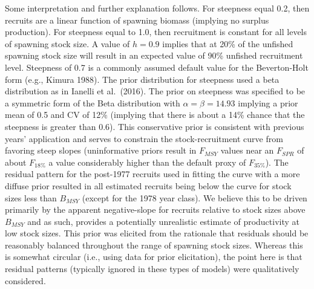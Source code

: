 \documentclass[11pt,
  english,
  a4paper,
]{article}
\begin{document}
\leavevmode\tagmcend\tagstructend\par


Some interpretation and further explanation follows. For steepness equal 0.2, then recruits are a linear function of spawning biomass (implying no surplus production). For steepness equal to 1.0, then recruitment is constant for all levels of spawning stock size. A value of {\(h = 0.9\)\leavevmode\tagmcend\tagstructend} implies that at 20\% of the unfished spawning stock size will result in an expected value of 90\% unfished recruitment level. Steepness of 0.7 is a commonly assumed default value for the Beverton-Holt form (e.g., Kimura 1988). The prior distribution for steepness used a beta distribution as in Ianelli et al.~(2016). The prior on steepness was specified to be a symmetric form of the Beta distribution with {\(\alpha = \beta = 14.93\)\leavevmode\tagmcend\tagstructend} implying a prior mean of 0.5 and CV of 12\% (implying that there is about a 14\% chance that the steepness is greater than 0.6). This conservative prior is consistent with previous years' application and serves to constrain the stock-recruitment curve from favoring steep slopes (uninformative priors result in {\(F_{MSY}\)\leavevmode\tagmcend\tagstructend} values near an {\(F_{SPR}\)\leavevmode\tagmcend\tagstructend} of about {\(F_{18\%}\)\leavevmode\tagmcend\tagstructend} a value considerably higher than the default proxy of {\(F_{35\%}\)\leavevmode\tagmcend\tagstructend}). The residual pattern for the post-1977 recruits used in fitting the curve with a more diffuse prior resulted in all estimated recruits being below the curve for stock sizes less than {\(B_{MSY}\)\leavevmode\tagmcend\tagstructend} (except for the 1978 year class). We believe this to be driven primarily by the apparent negative-slope for recruits relative to stock sizes above {\(B_{MSY}\)\leavevmode\tagmcend\tagstructend} and as such, provides a potentially unrealistic estimate of productivity at low stock sizes. This prior was elicited from the rationale that residuals should be reasonably balanced throughout the range of spawning stock sizes. Whereas this is somewhat circular (i.e., using data for prior elicitation), the point here is that residual patterns (typically ignored in these types of models) were qualitatively considered.
\end{document}
